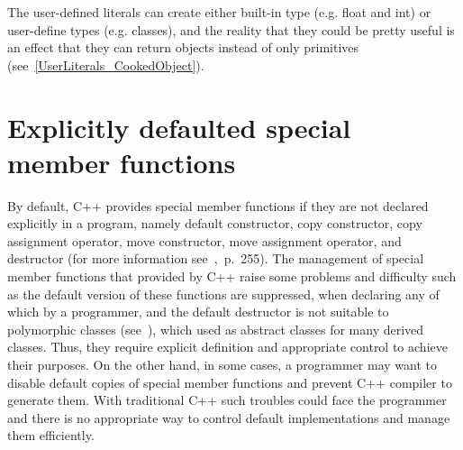 \documentclass[11pt]{report}
\begin{document}
The user-defined literals can create either built-in type (e.g. float and int) or user-define types (e.g. classes), and the reality that they could be pretty useful is an effect that they can return objects instead of only primitives (see~\ref{UserLiterals_CookedObject}).


\section{Explicitly defaulted special member functions}
\label{section: Defaulted special member functions}
By default, C++ provides special member functions if they are not declared explicitly in a program, namely default constructor, copy constructor, copy assignment operator, move constructor, move assignment operator, and destructor (for more information see~\cite{ISO:2011:Cpplanguage},~p.~255). The management of special member functions that provided by C++ raise some problems and difficulty such as the default version of these functions are suppressed, when declaring any of which by a programmer, and the default destructor is not suitable to polymorphic classes (see~\cite{Stroustrup:2012:Cpp11}), which used as abstract classes for many derived classes. Thus, they require explicit definition and appropriate control to achieve their purposes. On the other hand, in some cases, a programmer may want to disable default copies of special member functions and prevent C++ compiler to generate them. With traditional C++ such troubles could face the programmer and there is no appropriate way to control default implementations and manage them efficiently.
\end{document}
